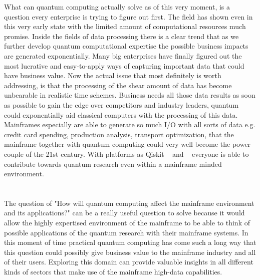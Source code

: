 What can quantum computing actually solve as of this very moment, is a question every enterprise is trying to figure out first. The field has shown even in this very early state with the limited amount of computational resources much promise. Inside the fields of data processing there is a clear trend that as we further develop quantum computational expertise the possible business impacts are generated exponentially. Many big enterprises have finally figured out the most lucrative and easy-to-apply ways of capturing important data that could have business value. Now the actual issue that most definitely is worth addressing, is that the processing of the shear amount of data has become unbearable in realistic time schemes. Business needs all those data results as soon as possible to gain the edge over competitors and industry leaders, quantum could exponentially aid classical computers with the processing of this data. Mainframes especially are able to generate so much I/O with all sorts of data e.g. credit card spending, production analysis, transport optimization, that the mainframe together with quantum computing could very well become the power couple of the 21st century. With platforms as Qiskit ~\textcite{Qiskit} and ~\textcite{Cirq} everyone is able to contribute towards quantum research even within a mainframe minded environment.

\section{}
\label{sec:onderzoeksvraag}

The question of "How will quantum computing affect the mainframe environment and its applications?" can be a really useful question to solve because it would allow the highly expertised environment of the mainframe to be able to think of possible applications of the quantum research with their mainframe systems. In this moment of time practical quantum computing has come such a long way that this question could possibly give business value to the mainframe industry and all of their users. Exploring this domain can provide valuable insights in all different kinds of sectors that make use of the mainframe high-data capabilities.

\section{}
\label{sec:onderzoeksdoelstelling}

